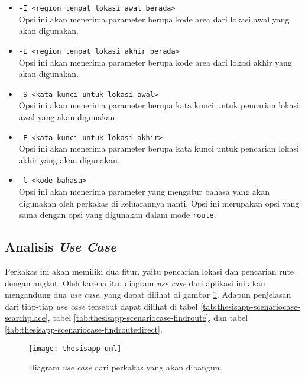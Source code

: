 \begin{itemize}
\begin{itemize}
		\begin{itemize}
			\item \verb|-I <region tempat lokasi awal berada>|\\
			Opsi ini akan menerima parameter berupa kode area dari lokasi awal yang akan digunakan.
			\item \verb|-E <region tempat lokasi akhir berada>|\\
			Opsi ini akan menerima parameter berupa kode area dari lokasi akhir yang akan digunakan.
			\item \verb|-S <kata kunci untuk lokasi awal>|\\
			Opsi ini akan menerima parameter berupa kata kunci untuk pencarian lokasi awal yang akan digunakan.
			\item \verb|-F <kata kunci untuk lokasi akhir>|\\
			Opsi ini akan menerima parameter berupa kata kunci untuk pencarian lokasi akhir yang akan digunakan.
			\item \verb|-l <kode bahasa>|\\
			Opsi ini akan menerima parameter yang mengatur bahasa yang akan digunakan oleh perkakas di keluarannya nanti. Opsi ini merupakan opsi yang sama dengan opsi yang digunakan dalam mode \verb|route|.
		\end{itemize}
		
	\end{itemize}
	
\end{itemize}

\subsection{Analisis \textit{Use Case}}
\label{sec:analysis-thesisapp-usecases}

Perkakas \cl ini akan memiliki dua fitur, yaitu pencarian lokasi dan pencarian rute dengan angkot. Oleh karena itu, diagram \textit{use case} dari aplikasi ini akan mengandung dua \textit{use case}, yang dapat dilihat di gambar \ref{fig:thesisapp-uml}. Adapun penjelasan dari tiap-tiap \textit{use case} tersebut dapat dilihat di tabel \ref{tab:thesisapp-scenariocase-searchplace}, tabel \ref{tab:thesisapp-scenariocase-findroute}, dan tabel \ref{tab:thesisapp-scenariocase-findroutedirect}.

\begin{figure}[ht]
    \centering
    \texttt{[image: thesisapp-uml]}
    \caption[Diagram \textit{use case} perkakas yang akan dibangun]{Diagram \textit{use case} dari perkakas yang akan dibangun.}
    \label{fig:thesisapp-uml}
\end{figure}

